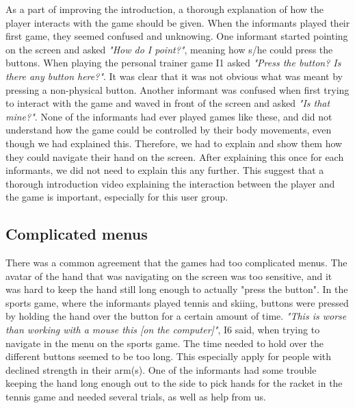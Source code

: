 As a part of improving the introduction, a thorough explanation of how the player interacts with the game should be given. When the informants played their first game, they seemed confused and unknowing. One informant started pointing on the screen and asked \emph{"How do I point?"}, meaning how s/he could press the buttons. When playing the personal trainer game I1 asked \emph{"Press the button? Is there any button here?"}. It was clear that it was not obvious what was meant by pressing a non-physical button. Another informant was confused when first trying to interact with the game and waved in front of the screen and asked \emph{"Is that mine?"}.  None of the informants had ever played games like these, and did not understand how the game could be controlled by their body movements, even though we had explained this. Therefore, we had to explain and show them how they could navigate their hand on the screen. After explaining this once for each informants, we did not need to explain this any further. This suggest that a thorough introduction video explaining the interaction between the player and the game is important, especially for this user group. 

\subsection{Complicated menus}
There was a common agreement that the games had too complicated menus.  The avatar of the hand that was navigating on the screen was too sensitive, and it was hard to keep the hand still long enough to actually "press the button". In the sports game, where the informants played tennis and skiing, buttons were pressed by holding the hand over the button for a certain amount of time. \emph{"This is worse than working with a mouse this [on the computer]"}, I6 said, when trying to navigate in the menu on the sports game. The time needed to hold over the different buttons seemed to be too long. This especially apply for people with declined strength in their arm(s). One of the informants had some trouble keeping the hand long enough out to the side to pick hands for the racket in the tennis game and needed several trials, as well as help from us.

